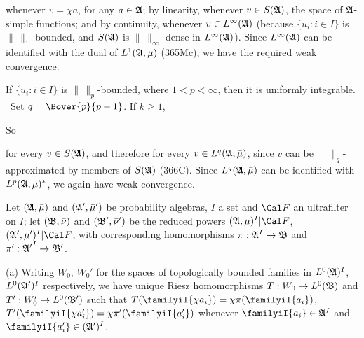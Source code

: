 {

\noindent whenever $v=\chi a$, for any $a\in\frak A$;  by linearity,
whenever $v\in S(\frak A)$, the space of $\frak A$-simple functions;
and by continuity, whenever $v\in L^{\infty}(\frak A)$ (because
$\{u_i:i\in I\}$ is $\|\,\|_1$-bounded, and $S(\frak A)$ is
$\|\,\|_{\infty}$-dense in $L^{\infty}(\frak A)$).
Since $L^{\infty}(\frak A)$ can be
identified with the dual of $L^1(\frak A,\bar\mu)$ (365Mc), we have the
required weak convergence.\ \Qed

\medskip

 If $\{u_i:i\in I\}$ is $\|\,\|_p$-bounded,
where $1<p<\infty$, then it is uniformly integrable.   \Prf\
Set $q=\Bover{p}{p-1}$.   If $k\ge 1$,

\Centerline{$\inf_{k\ge 1}\sup_{i\in I}\int(|u_i|-k\chi 1_{\frak A})^+
\le\inf_{k\ge 1}\Bover1{k^{p-1}}\sup_{i\in I}\|u_i\|_p^p=0$.  \Qed}

\noindent So


\noindent for every $v\in S(\frak A)$, and therefore for every
$v\in L^q(\frak A,\bar\mu)$, since $v$ can be $\|\,\|_q$-approximated by
members of
$S(\frak A)$ (366C).   Since $L^q(\frak A,\bar\mu)$ can be identified with
$L^p(\frak A,\bar\mu)^*$, we again have weak convergence.
}%

 Let $(\frak A,\bar\mu)$ and
$(\frak A',\bar\mu')$ be probability algebras, $I$ a set and $\Cal F$ an
ultrafilter on $I$;  let $(\frak B,\bar\nu)$ and $(\frak B',\bar\nu')$ be
the reduced powers $(\frak A,\bar\mu)^I|\Cal F$,
$(\frak A',\bar\mu')^I|\Cal F$, %
with corresponding homomorphisms $\pi:\frak A^I\to\frak B$ and
$\pi':{\frak A'}^I\to\frak B'$.

(a) Writing $W_0$, $W_0'$ for the spaces of topologically
bounded families in $L^0(\frak A)^I$, $L^0(\frak A')^I$ respectively,
we have unique Riesz homomorphisms $T:W_0\to L^0(\frak B)$ and
$T':W_0'\to L^0(\frak B')$ such that
$T(\familyiI{\chi a_i})=\chi\pi(\familyiI{a_i})$,
$T'(\familyiI{\chi a'_i})=\chi\pi'(\familyiI{a'_i})$ whenever
$\familyiI{a_i}\in\frak A^I$ and $\familyiI{a'_i}\in(\frak A')^I$.

